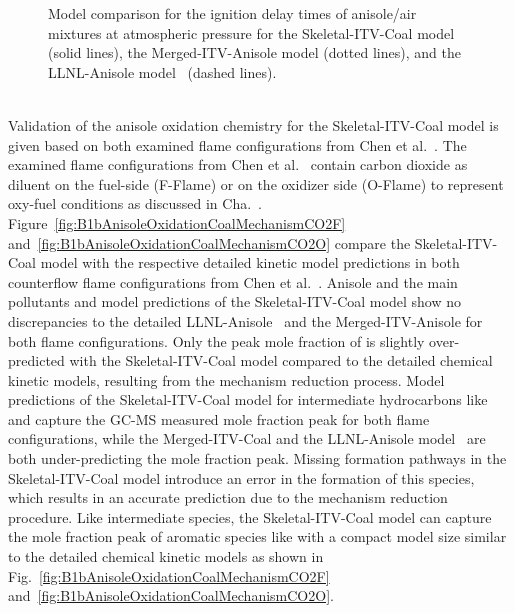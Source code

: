 \begin{refsection}
\begin{figure}[h]
  \centering
  \hfill
  \hfill
  \caption{Model comparison for the ignition delay times of anisole/air mixtures at atmospheric pressure for the Skeletal-ITV-Coal model (solid lines), the Merged-ITV-Anisole model (dotted lines), and the LLNL-Anisole model~\cite{Wagnon2018} (dashed lines).}
  \label{fig:B1bIDTAnisoleCoalMechanism}
\end{figure}
\\
Validation of the anisole oxidation chemistry for the Skeletal-ITV-Coal model is given based on both examined flame configurations from Chen et al.~\cite{Chen2022}. The examined flame configurations from Chen et al.~\cite{Chen2022} contain carbon dioxide as diluent on the fuel-side (F-Flame) or on the oxidizer side (O-Flame) to represent oxy-fuel conditions as discussed in Cha.~. Figure~\ref{fig:B1bAnisoleOxidationCoalMechanismCO2F} and~\ref{fig:B1bAnisoleOxidationCoalMechanismCO2O} compare the Skeletal-ITV-Coal model with the respective detailed kinetic model predictions in both counterflow flame configurations from Chen et al.~\cite{Chen2022}. Anisole and the main pollutants  and  model predictions of the Skeletal-ITV-Coal model show no discrepancies to the detailed LLNL-Anisole~\cite{Wagnon2018} and the Merged-ITV-Anisole for both flame configurations. Only the peak mole fraction of  is slightly over-predicted with the Skeletal-ITV-Coal model compared to the detailed chemical kinetic models, resulting from the mechanism reduction process. Model predictions of the Skeletal-ITV-Coal model for intermediate hydrocarbons like  and  capture the GC-MS measured mole fraction peak for both flame configurations, while the Merged-ITV-Coal and the LLNL-Anisole model~\cite{Wagnon2018} are both under-predicting the mole fraction peak. Missing formation pathways in the Skeletal-ITV-Coal model introduce an error in the formation of this species, which results in an accurate prediction due to the mechanism reduction procedure. Like intermediate species, the Skeletal-ITV-Coal model can capture the mole fraction peak of aromatic species like  with a compact model size similar to the detailed chemical kinetic models as shown in Fig.~\ref{fig:B1bAnisoleOxidationCoalMechanismCO2F} and~\ref{fig:B1bAnisoleOxidationCoalMechanismCO2O}.

\end{refsection}
